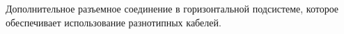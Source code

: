Дополнительное разъемное соединение в горизонтальной 
подсистеме, которое обеспечивает использование разнотипных
кабелей.